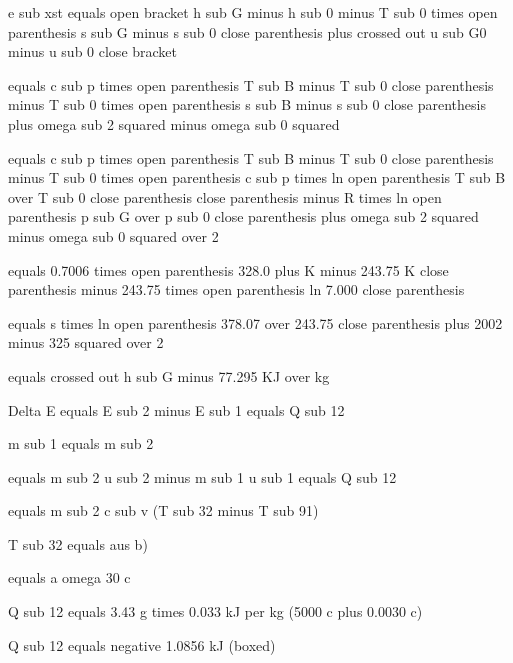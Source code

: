e sub xst equals open bracket h sub G minus h sub 0 minus T sub 0 times open parenthesis s sub G minus s sub 0 close parenthesis plus crossed out u sub G0 minus u sub 0 close bracket

equals c sub p times open parenthesis T sub B minus T sub 0 close parenthesis minus T sub 0 times open parenthesis s sub B minus s sub 0 close parenthesis plus omega sub 2 squared minus omega sub 0 squared

equals c sub p times open parenthesis T sub B minus T sub 0 close parenthesis minus T sub 0 times open parenthesis c sub p times ln open parenthesis T sub B over T sub 0 close parenthesis close parenthesis minus R times ln open parenthesis p sub G over p sub 0 close parenthesis plus omega sub 2 squared minus omega sub 0 squared over 2

equals 0.7006 times open parenthesis 328.0 plus K minus 243.75 K close parenthesis minus 243.75 times open parenthesis ln 7.000 close parenthesis

equals s times ln open parenthesis 378.07 over 243.75 close parenthesis plus 2002 minus 325 squared over 2

equals crossed out h sub G minus 77.295 KJ over kg

Delta E equals E sub 2 minus E sub 1 equals Q sub 12

m sub 1 equals m sub 2

equals m sub 2 u sub 2 minus m sub 1 u sub 1 equals Q sub 12

equals m sub 2 c sub v (T sub 32 minus T sub 91)

T sub 32 equals aus b)

equals a omega 30 c

Q sub 12 equals 3.43 g times 0.033 kJ per kg (5000 c plus 0.0030 c)

Q sub 12 equals negative 1.0856 kJ (boxed)